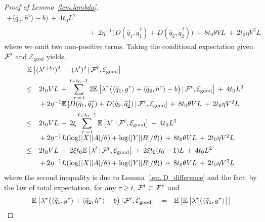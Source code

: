 \documentclass[12pt, final]{l4dc2023}
\begin{document}
\begin{proof}[Proof of Lemma~\ref{lem.lambda}]
\[\begin{array}{rcl}
	+ \langle{ \bar q_2},{h^{\tau}}\rangle -b\big)	\,+\,4t_0L^2
	\\[0.2cm]
	&& \,+\, 2\eta^{-1} \big(D(\bar q_1,\tilde q_1^{\,t}) + D( \bar q_2, \tilde q_2^{\,t}) \big)
	\,+\,8t_0\theta V L\,+\,2t_0\eta V^2 L
	\end{array}
	\]
	where we omit two non-positive terms.
	Taking the conditional expectation given ${\mathcal{F}}^{t}$ and $\mathcal{E}_{\text{good}}$ yields,
	\begin{equation}\label{eq.pushback_slater}
	\begin{array}{rcl}
	&& \!\!\!\! \!\!\!\! \!\! 
	\mathbb{E} \sbr{ (\lambda^{t+t_0})^2 \,-\, (\lambda^{t})^2 \,\vert\, \calF^{t}, \mathcal{E}_{\text{good}} }
	\\[0.2cm]
	& \leq & \displaystyle 2t_0VL
	\,+\,\sum_{\tau\,=\,t}^{t+t_0-1} 
	2 \mathbb{E} \sbr{ \lambda^{\tau} \big(\langle{ \bar q_1},{g^{\tau}}\rangle 
		+ \langle{ \bar q_2},{h^{\tau}}\rangle -b\big) \,\vert\, \calF^{t}, \mathcal{E}_{\text{good}}  }	\,+\,4t_0L^2
	\\[0.2cm]
	&& \,+\, 2\eta^{-1} \mathbb{E} \sbr{ D(\bar q_1,\tilde q_1^{\,t}) + D( \bar q_2, \tilde q_2^{\,t}) \,\vert\, \calF^{t}, \mathcal{E}_{\text{good}}  }
	\,+\,8t_0\theta V L\,+\,2t_0\eta V^2 L
	\\[0.2cm]
	& \leq & \displaystyle 2t_0 VL
	\,-\,2\xi\sum_{\tau\,=\,t}^{t+t_0-1} 
	\mathbb{E}\sbr{ \lambda^{\tau}  \,\vert\, \calF^{t}, \mathcal{E}_{\text{good}} }
	\,+\,4t_0L^2
	\\[0.2cm]
	&& \,+\, 2\eta^{-1} L(\log(|X||A|/\theta)+\log(|Y||B|/\theta))
	\,+\,8t_0\theta V L\,+\,2t_0\eta V^2 L
	\\[0.2cm]
	& \leq & \displaystyle 2t_0 VL
	\,-\,2\xi t_0 \mathbb{E}\sbr{  \lambda^t \,\vert\, \calF^{t}, \mathcal{E}_{\text{good}}  } 
	\,+\,2 \xi t_0(t_0-1)L
	\,+\,4t_0L^2
	\\[0.2cm]
	&& \,+\, 2\eta^{-1} L(\log(|X||A|/\theta)+\log(|Y||B|/\theta))
	\,+\,8t_0\theta V L\,+\,2t_0\eta V^2 L
	\end{array}
	\end{equation}
	where the second inequality is due to Lemma~\ref{lem.D_difference} and the fact: by the law of total expectation, for any $\tau\geq t$, ${\mathcal{F}}^{t}\subset{\mathcal{F}}^\tau$ and
	\[
	\begin{array}{rcl}
	\mathbb{E} \left[ \lambda^{\tau} \big(\langle{ \bar q_1},{g^{\tau}}\rangle 
		+ \langle{ \bar q_2},{h^{\tau}}\rangle -b\big) \,\vert\, {\mathcal{F}}^{t}, \mathcal{E}_{\text{good}}  \right]
	&=&
	\mathbb{E} \left[ \mathbb{E} \left[ \lambda^{\tau} \big(\langle{ \bar q_1},{g^{\tau}}\rangle 
\right]\right]
\end{array}\]
\end{proof}
\end{document}
